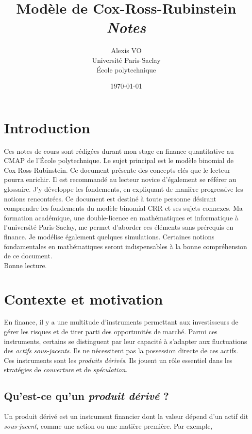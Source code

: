 \documentclass[12pt,a4paper]{article}
\title{\Huge{\textbf{Modèle de Cox-Ross-Rubinstein}}\\ \medskip
      \Huge{\textit{Notes}}\vspace*{0.7cm}}
\author{\LARGE{Alexis VO}\vspace{1cm}\\ \medskip
      Université Paris-Saclay\\École polytechnique}
\date{\vspace{0.2cm}\today}
\begin{document}
\renewcommand\labelitemi{\textbullet}

\maketitle

\newpage

\section*{Introduction}
Ces notes de cours sont rédigées durant mon stage en finance quantitative au CMAP de l'École polytechnique. Le sujet principal est le modèle binomial de Cox-Ross-Rubinstein. Ce document présente des concepts clés que le lecteur pourra enrichir. Il est recommandé au lecteur novice d'également se référer au glossaire. J'y développe les fondements, en expliquant de manière progressive les notions rencontrées.  Ce document est destiné à toute personne désirant comprendre les fondements du modèle binomial CRR et ses sujets connexes. Ma formation académique, une double-licence en mathématiques et informatique à l'université Paris-Saclay, me permet d'aborder ces éléments sans prérequis en finance. Je modélise également quelques simulations. Certaines notions fondamentales en mathématiques seront indispensables à la bonne compréhension de ce document.\\Bonne lecture.

\newpage

\tableofcontents

\newpage

\section{Contexte et motivation}
En finance, il y a une multitude d'instruments permettant aux investisseurs de gérer les risques et de tirer parti des opportunités de marché. Parmi ces instruments, certains se distinguent par leur capacité à s'adapter aux fluctuations des \textit{actifs sous-jacents}. Ils ne nécessitent pas la possession directe de ces actifs. Ces instruments sont les \textit{produits dérivés}. Ils jouent un rôle essentiel dans les stratégies de \textit{couverture} et de \textit{spéculation}.

\subsection{Qu'est-ce qu'un \textit{produit dérivé} ?}
Un produit dérivé est un instrument financier dont la valeur dépend d'un actif dit \textit{sous-jacent}, comme une action ou une matière première. Par exemple,
\end{document}
